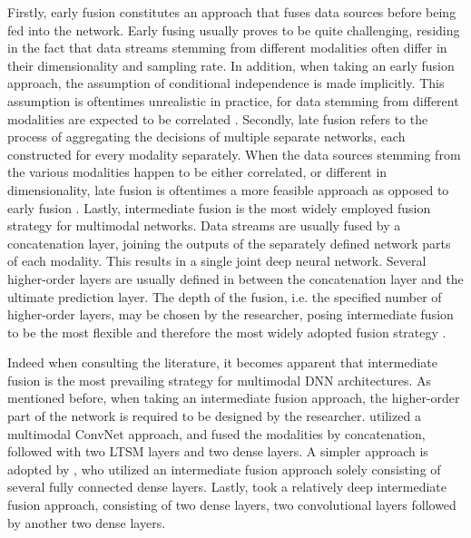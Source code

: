 \documentclass[fleqn,11pt]{paper}
\begin{document}
Firstly, early fusion constitutes an approach that fuses data sources before being fed into the network. Early fusing usually proves to be quite challenging, residing in the fact that data streams stemming from different modalities often differ in their dimensionality and sampling rate. In addition, when taking an early fusion approach, the assumption of conditional independence is made implicitly. This assumption is oftentimes unrealistic in practice, for data stemming from different modalities are expected to be correlated \cite{ramachandram2017deep}. Secondly, late fusion refers to the process of aggregating the decisions of multiple separate networks, each constructed for every modality separately. When the data sources stemming from the various modalities happen to be either correlated, or different in dimensionality, late fusion is oftentimes a more feasible approach as opposed to early fusion \cite{ramachandram2017deep}. Lastly, intermediate fusion is the most widely employed fusion strategy for multimodal networks. Data streams are usually fused by a concatenation layer, joining the outputs of the separately defined network parts of each modality. This results in a single joint deep neural network. Several higher-order layers are usually defined in between the concatenation layer and the ultimate prediction layer. The depth of the fusion, i.e. the specified number of higher-order layers, may be chosen by the researcher, posing intermediate fusion to be the most flexible and therefore the most widely adopted fusion strategy \cite{ramachandram2017deep}.

Indeed when consulting the literature, it becomes apparent that intermediate fusion is the most prevailing strategy for multimodal DNN architectures. As mentioned before, when taking an intermediate fusion approach, the higher-order part of the network is required to be designed by the researcher.  utilized a multimodal ConvNet approach, and fused the modalities by concatenation, followed with two LTSM layers and two dense layers. A simpler approach is adopted by , who utilized an intermediate fusion approach solely consisting of several fully connected dense layers. Lastly,  took a relatively deep intermediate fusion approach, consisting of two dense layers, two convolutional layers followed by another two dense layers.  
\end{document}
